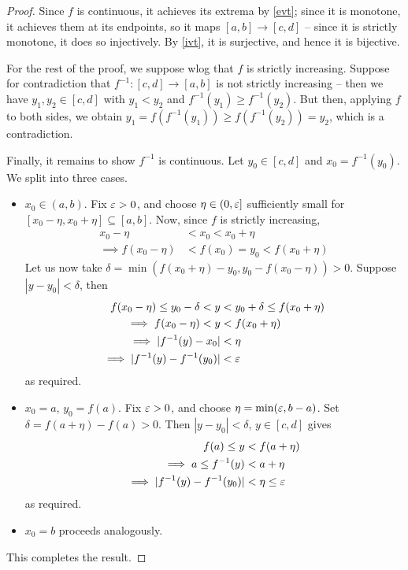 \documentclass{../../template/note}
\begin{document}
    \begin{proof}
        Since \(f\) is continuous, it achieves its extrema by \cref{evt}; since it is monotone, it achieves them at its endpoints, so it maps \([a, b] \to [c, d]\) -- since it is strictly monotone, it does so injectively. By \cref{ivt}, it is surjective, and hence it is bijective.

        For the rest of the proof, we suppose wlog that \(f\) is strictly increasing. Suppose for contradiction that \(f^{-1}: [c, d] \to [a, b]\) is not strictly increasing -- then we have \(y_1, y_2 \in [c, d]\) with \(y_1 < y_2\) and \(f^{-1}(y_1) \geq f^{-1}(y_2)\). But then, applying \(f\) to both sides, we obtain \(y_1 = f(f^{-1}(y_1)) \geq f(f^{-1}(y_2)) = y_2\), which is a contradiction.

        Finally, it remains to show \(f^{-1}\) is continuous. Let \(y_0 \in [c, d]\) and \(x_0 = f^{-1}(y_0)\). We split into three cases.
        \begin{itemize}
            \item \(x_0 \in (a, b)\). Fix \(\varepsilon > 0\), and choose \(\eta \in (0, \varepsilon]\) sufficiently small for \([x_0 - \eta, x_0 + \eta] \subseteq [a, b]\). Now, since \(f\) is strictly increasing,
            \begin{align*}
                x_0 - \eta &< x_0 < x_0 + \eta \\
                \implies f(x_0 - \eta) &< f(x_0) = y_0 < f(x_0 + \eta)
            \end{align*}
            Let us now take \(\delta = \min(f(x_0 + \eta) - y_0, y_0 - f(x_0 - \eta)) > 0\). Suppose \(|y-y_0| < \delta\), then
            \begin{align*}
                f(x_0 - \eta) \leq y_0 - \delta < y &< y_0 + \delta \leq f(x_0 + \eta) \\
                \implies f(x_0 - \eta) < y &< f(x_0 + \eta) \\
                \implies |f^{-1}(y) - x_0| &< \eta \\
                \implies |f^{-1}(y) - f^{-1}(y_0)| &< \varepsilon
            \end{align*}
            as required.
            \item \(x_0 = a\), \(y_0 = f(a)\). Fix \(\varepsilon > 0\), and choose \(\eta = \min(\varepsilon, b-a)\). Set \(\delta = f(a + \eta) - f(a) > 0\). Then \(|y-y_0| < \delta\), \(y \in [c, d]\) gives
            \begin{align*}
                f(a) \leq y &< f(a + \eta) \\
                \implies a \leq f^{-1}(y) &< a + \eta \\
                \implies |f^{-1}(y)-f^{-1}(y_0)| &< \eta \leq \varepsilon
            \end{align*}
            as required.
            \item \(x_0 = b\) proceeds analogously.               
        \end{itemize}
        This completes the result.        
    \end{proof}
    
\end{document}
